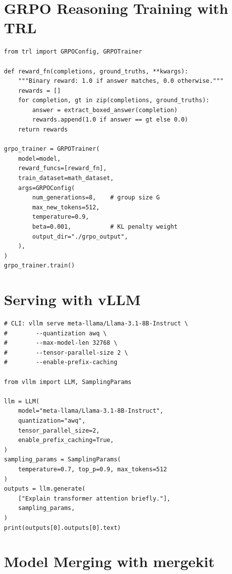 \section{GRPO Reasoning Training with TRL}

\begin{lstlisting}[style=pythonstyle, caption={GRPO training for reasoning with verifiable rewards}]
from trl import GRPOConfig, GRPOTrainer

def reward_fn(completions, ground_truths, **kwargs):
    """Binary reward: 1.0 if answer matches, 0.0 otherwise."""
    rewards = []
    for completion, gt in zip(completions, ground_truths):
        answer = extract_boxed_answer(completion)
        rewards.append(1.0 if answer == gt else 0.0)
    return rewards

grpo_trainer = GRPOTrainer(
    model=model,
    reward_funcs=[reward_fn],
    train_dataset=math_dataset,
    args=GRPOConfig(
        num_generations=8,    # group size G
        max_new_tokens=512,
        temperature=0.9,
        beta=0.001,           # KL penalty weight
        output_dir="./grpo_output",
    ),
)
grpo_trainer.train()
\end{lstlisting}

\section{Serving with vLLM}

\begin{lstlisting}[style=pythonstyle, caption={Launching a production vLLM OpenAI-compatible server}]
# CLI: vllm serve meta-llama/Llama-3.1-8B-Instruct \
#        --quantization awq \
#        --max-model-len 32768 \
#        --tensor-parallel-size 2 \
#        --enable-prefix-caching

from vllm import LLM, SamplingParams

llm = LLM(
    model="meta-llama/Llama-3.1-8B-Instruct",
    quantization="awq",
    tensor_parallel_size=2,
    enable_prefix_caching=True,
)
sampling_params = SamplingParams(
    temperature=0.7, top_p=0.9, max_tokens=512
)
outputs = llm.generate(
    ["Explain transformer attention briefly."],
    sampling_params,
)
print(outputs[0].outputs[0].text)
\end{lstlisting}

\section{Model Merging with mergekit}

